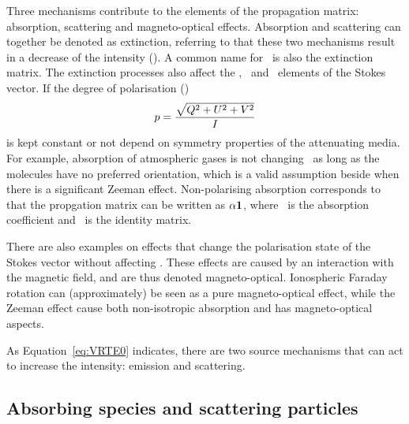 Three mechanisms contribute to the elements of the propagation matrix:
absorption, scattering and magneto-optical effects. Absorption and scattering
can together be denoted as extinction, referring to that these two mechanisms
result in a decrease of the intensity (\StoI). A common name for \ExtMat\ is
also the extinction matrix. The extinction processes also affect the \StoQ,
\StoU\ and \StoV\ elements of the Stokes vector. If the degree of polarisation
(\DgrPlr)
\begin{equation}
  \label{eq:degreeofpol}
  p = \frac{\sqrt{Q^2+U^2+V^2}}{I}
\end{equation}
is kept constant or not depend on symmetry properties of the attenuating media.
For example, absorption of atmospheric gases is not changing \DgrPlr\ as long
as the molecules have no preferred orientation, which is a valid assumption
beside when there is a significant Zeeman effect. Non-polarising absorption
corresponds to that the propgation matrix can be written as ${\alpha}\mathbf{1}$,
where \AbsCoef\ is the absorption coefficient and \IdnMtr\ is the identity
matrix.

There are also examples on effects that change the polarisation state of the
Stokes vector without affecting \StoI. These effects are caused by an
interaction with the magnetic field, and are thus denoted magneto-optical.
Ionospheric Faraday rotation can (approximately) be seen as a pure
magneto-optical effect, while the Zeeman effect cause both non-isotropic
absorption and has magneto-optical aspects.

As Equation~\ref{eq:VRTE0} indicates, there are two source mechanisms that can
act to increase the intensity: emission and scattering.


\subsection{Absorbing species and scattering particles}
\label{sec:rteq:absspecies}

